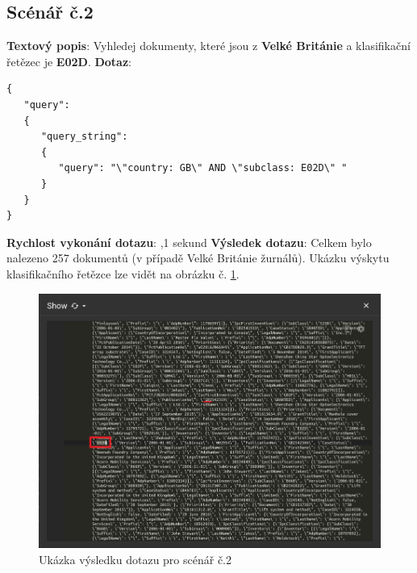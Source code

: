 \subsection{Scénář č.2}
\textbf{Textový popis}: Vyhledej dokumenty, které jsou z \textbf{Velké Británie} a klasifikační řetězec je \textbf{E02D}.
\newline
\textbf{Dotaz}: 
\begin{lstlisting}[label = {lst:elements_a}]
{
   "query": 
   {
      "query_string": 
      {
         "query": "\"country: GB\" AND \"subclass: E02D\" "
      }
   }
}
\end{lstlisting}
\textbf{Rychlost vykonání dotazu}: ,1 sekund
\newline
\textbf{Výsledek dotazu}: Celkem bylo nalezeno 257 dokumentů (v případě Velké Británie žurnálů). Ukázku výskytu klasifikačního řetězce lze vidět na obrázku č. \ref{fig:scenar_2_mongo}.
\begin{figure}[H]
\centering
\includegraphics[width=14cm]{img/scenare/scenar_2_mongo}
\caption{Ukázka výsledku dotazu pro scénář č.2}
\label{fig:scenar_2_mongo}
\end{figure}

\newpage

